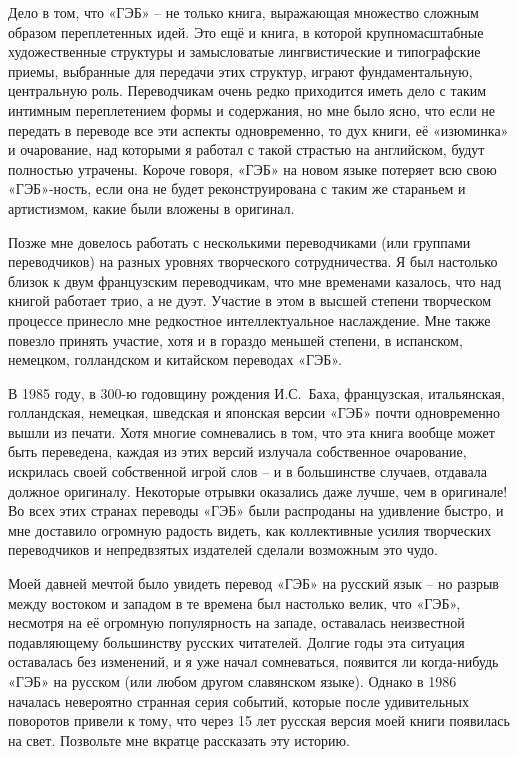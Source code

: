\documentclass[../main.tex]{subfiles}
\begin{document}
Дело в том, что «ГЭБ» \--- не только книга, выражающая множество сложным образом переплетенных идей. Это ещё и книга, в которой крупномасштабные художественные структуры и замысловатые лингвистические и типографские приемы, выбранные для передачи этих структур, играют фундаментальную, центральную роль. Переводчикам очень редко приходится иметь дело с таким интимным переплетением формы и содержания, но мне было ясно, что если не передать в переводе все эти аспекты одновременно, то дух книги, её «изюминка» и очарование, над которыми я работал с такой страстью на английском, будут полностью утрачены. Короче говоря, «ГЭБ» на новом языке потеряет всю свою «ГЭБ»-ность, если она не будет реконструирована с таким же стараньем и артистизмом, какие были вложены в оригинал.

Позже мне довелось работать с несколькими переводчиками (или группами переводчиков) на разных уровнях творческого сотрудничества. Я был настолько близок к двум французским переводчикам, что мне временами казалось, что над книгой работает трио, а не дуэт. Участие в этом в высшей степени творческом процессе принесло мне редкостное интеллектуальное наслаждение. Мне также повезло принять участие, хотя и в гораздо меньшей степени, в испанском, немецком, голландском и китайском переводах «ГЭБ».

В 1985 году, в 300-ю годовщину рождения И.С.~Баха, французская, итальянская, голландская, немецкая, шведская и японская версии «ГЭБ» почти одновременно вышли из печати. Хотя многие сомневались в том, что эта книга вообще может быть переведена, каждая из этих версий излучала собственное очарование, искрилась своей собственной игрой слов \--- и в большинстве случаев, отдавала должное оригиналу. Некоторые отрывки оказались даже лучше, чем в оригинале! Во всех этих странах переводы «ГЭБ» были распроданы на удивление быстро, и мне доставило огромную радость видеть, как коллективные усилия творческих переводчиков и непредвзятых издателей сделали возможным это чудо.

Моей давней мечтой было увидеть перевод «ГЭБ» на русский язык \--- но разрыв между востоком и западом в те времена был настолько велик, что «ГЭБ», несмотря на её огромную популярность на западе, оставалась неизвестной подавляющему большинству русских читателей. Долгие годы эта ситуация оставалась без изменений, и я уже начал сомневаться, появится ли когда-нибудь «ГЭБ» на русском (или любом другом славянском языке). Однако в 1986 началась невероятно странная серия событий, которые после удивительных поворотов привели к тому, что через 15 лет русская версия моей книги появилась на свет. Позвольте мне вкратце рассказать эту историю.
\end{document}

